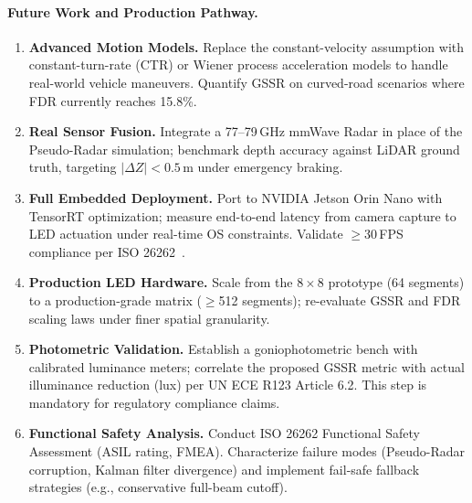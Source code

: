 \documentclass{jstarticle}
\theoremstyle{remark}
\begin{document}
\paragraph{Future Work and Production Pathway.}
\begin{enumerate}[label=\textbf{(\roman*)},leftmargin=*]
  \item \textbf{Advanced Motion Models.} Replace the constant-velocity
    assumption with constant-turn-rate (CTR) or Wiener process
    acceleration models to handle real-world vehicle maneuvers.
    Quantify GSSR on curved-road scenarios where FDR currently reaches
    15.8\%.
  \item \textbf{Real Sensor Fusion.} Integrate a 77--79\,GHz mmWave
    Radar in place of the Pseudo-Radar simulation; benchmark depth
    accuracy against LiDAR ground truth, targeting $|\Delta Z| < 0.5$\,m
    under emergency braking.
  \item \textbf{Full Embedded Deployment.} Port to NVIDIA Jetson Orin
    Nano with TensorRT optimization; measure end-to-end latency from
    camera capture to LED actuation under real-time OS constraints.
    Validate $\geq$30\,FPS compliance per ISO 26262~\cite{iso26262}.
  \item \textbf{Production LED Hardware.} Scale from the $8\times8$
    prototype (64 segments) to a production-grade matrix
    ($\geq$512 segments); re-evaluate GSSR and FDR scaling laws under
    finer spatial granularity.
  \item \textbf{Photometric Validation.} Establish a goniophotometric
    bench with calibrated luminance meters; correlate the proposed GSSR
    metric with actual illuminance reduction (lux) per UN ECE R123
    Article 6.2. This step is mandatory for regulatory compliance claims.
  \item \textbf{Functional Safety Analysis.} Conduct ISO 26262
    Functional Safety Assessment (ASIL rating, FMEA). Characterize
    failure modes (Pseudo-Radar corruption, Kalman filter divergence)
    and implement fail-safe fallback strategies (e.g., conservative
    full-beam cutoff).
\end{enumerate}

\printbibliography
\end{document}
